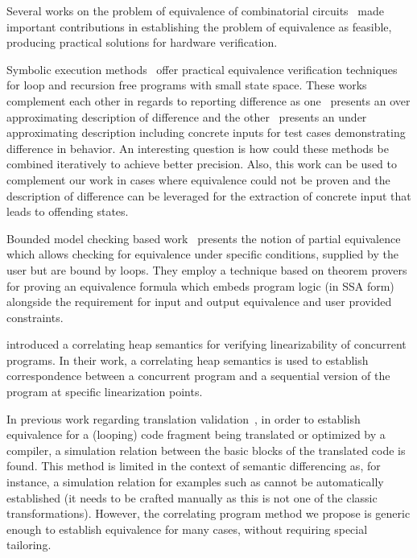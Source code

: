 Several works on the problem of equivalence of combinatorial circuits~\cite{KuehlmannKrohm97,BraytonChatterjeeMishchenkoEen06,ClarkeKroening03} made important contributions in establishing the problem of equivalence as feasible, producing practical solutions for hardware verification.

Symbolic execution methods~\cite{DwyerElbaumPerson08,EnglerRamos11} offer practical equivalence verification techniques for loop and recursion free programs with small state space. These works complement each other in regards to reporting difference as one~\cite{DwyerElbaumPerson08} presents an over approximating description of difference and the other~\cite{EnglerRamos11} presents an under approximating description including concrete inputs for test cases demonstrating difference in behavior. An interesting question is how could these methods be combined iteratively to achieve better precision. Also, this work can be used to complement our work in cases where equivalence could not be proven and the description of difference can be leveraged for the extraction of concrete input that leads to offending states.

Bounded model checking based work~\cite{GodlinStrichman09} presents the notion of partial equivalence which allows checking for equivalence under specific conditions, supplied by the user but are bound by loops. They employ a technique based on theorem provers for proving an equivalence formula which embeds program logic (in SSA form) alongside the requirement for input and output equivalence and user provided constraints.

\cite{AmitRinetzkyRepsSagivYahav07} introduced a correlating heap semantics for verifying linearizability of concurrent programs. In their work, a correlating heap semantics is used to establish correspondence between a concurrent program and a sequential version of the program at specific linearization points.

\nocite{BruynoogheJanssensVerdoolaege2009}

In previous work regarding translation validation~\cite{PnueliSiegelSingerman98,Necula00,HuGoldbergFangPnueliZuck02}, in order to establish equivalence for a (looping) code fragment being translated or optimized by a compiler, a simulation relation between the basic blocks of the translated code is found. This method is limited in the context of semantic differencing as, for instance, a simulation relation for examples such as  cannot be automatically established (it needs to be crafted manually as this is not one of the classic transformations). However, the correlating program method we propose is generic enough to establish equivalence for many cases, without requiring special tailoring.
